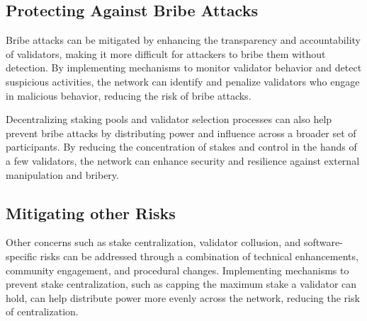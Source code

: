 \subsection{Protecting Against Bribe Attacks}

Bribe attacks can be mitigated by enhancing the transparency and accountability of validators, making it more difficult for attackers to bribe them without detection. By implementing mechanisms to monitor validator behavior and detect suspicious activities, the network can identify and penalize validators who engage in malicious behavior, reducing the risk of bribe attacks.

Decentralizing staking pools and validator selection processes can also help prevent bribe attacks by distributing power and influence across a broader set of participants. By reducing the concentration of stakes and control in the hands of a few validators, the network can enhance security and resilience against external manipulation and bribery.

\subsection {Mitigating other Risks}

Other concerns such as stake centralization, validator collusion, and software-specific risks can be addressed through a combination of technical enhancements, community engagement, and procedural changes. Implementing mechanisms to prevent stake centralization, such as capping the maximum stake a validator can hold, can help distribute power more evenly across the network, reducing the risk of centralization.